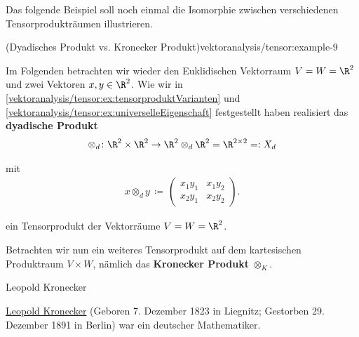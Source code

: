 \documentclass[letterpaper,10pt,german]{jupyterBook}
\begin{document}
\par
Das folgende Beispiel soll noch einmal die Isomorphie zwischen verschiedenen Tensorprodukträumen illustrieren.
\begin{example}{(Dyadisches Produkt vs. Kronecker Produkt)}{vektoranalysis/tensor:example-9}



\par
Im Folgenden betrachten wir wieder den Euklidischen Vektorraum \(V=W=\R^2\) und zwei Vektoren \(x, y \in \R^2\).
Wie wir in \cref{vektoranalysis/tensor:ex:tensorproduktVarianten} und \cref{vektoranalysis/tensor:ex:universelleEigenschaft} festgestellt haben realisiert das \textbf{dyadische Produkt}
\begin{align*}
\otimes_d \colon \R^2 \times \R^2 \rightarrow \R^2 \otimes_d \R^2 = \R^{2 \times 2} =: X_d
\end{align*}
\par
mit
\begin{align*}
x \otimes_d y \, \coloneqq \,
\begin{pmatrix}
x_1y_1 & x_1y_2 \\
x_2y_1 & x_2y_2
\end{pmatrix}.
\end{align*}
\par
ein Tensorprodukt der Vektorräume \(V=W=\R^2\).

\par
Betrachten wir nun ein weiteres Tensorprodukt auf dem kartesischen Produktraum \(V \times W\), nämlich das \textbf{Kronecker Produkt} \(\otimes_K\).

\begin{emphBox}{Leopold Kronecker}{}

\par
\href{https://de.wikipedia.org/wiki/Leopold\_Kronecker}{Leopold Kronecker} (Geboren 7. Dezember 1823 in Liegnitz; Gestorben 29. Dezember 1891 in Berlin) war ein deutscher Mathematiker.
\end{emphBox}


\end{example}
\end{document}
